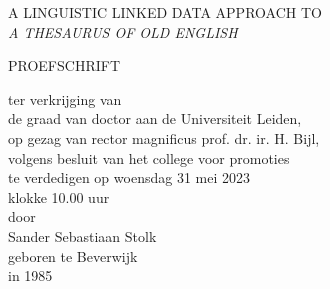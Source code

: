 

\begin{titlepage}

    \vspace{4cm}
    \begin{center}
    
    \textsf{
    {\fontsize{33}{43}\selectfont{
      Digital Thesauri\\
      as Semantic Treasure Troves\\[0.5em]
    }}
    \Large{\MakeUppercase{
      A Linguistic Linked Data Approach to\\[0.3em]
      \emph{A Thesaurus of Old English}\\[3cm]
    }}
    }
    
    
    \normalsize
    \begin{doublespace}
    PROEFSCHRIFT\bigskip
        
    ter verkrijging van\\ 
    de graad van doctor aan de Universiteit Leiden,\\
    op gezag van rector magnificus prof. dr. ir. H. Bijl,\\ 
    volgens besluit van het college voor promoties\\
    te verdedigen op woensdag 31 mei 2023\\
    klokke 10.00 uur\\[1cm] 
     
    door\\[1cm]
         
    \large{Sander Sebastiaan Stolk}\\[0.5cm]
	
    \normalsize geboren te Beverwijk \\
    in 1985
    
    \end{doublespace}
  
	

    \end{center}
    
    

\end{titlepage}